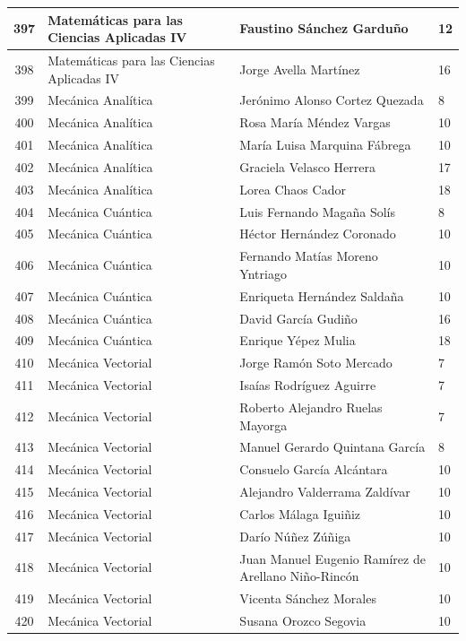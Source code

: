{\begin{longtable}{|c|p{6.5cm}|p{5cm}|p{1.5cm}|}
397 & Matemáticas para las Ciencias Aplicadas IV & Faustino Sánchez Garduño & 12 \\ \hline
398 & Matemáticas para las Ciencias Aplicadas IV & Jorge Avella Martínez & 16 \\ \hline
399 & Mecánica Analítica & Jerónimo Alonso Cortez Quezada & 8 \\ \hline
400 & Mecánica Analítica & Rosa María Méndez Vargas & 10 \\ \hline
401 & Mecánica Analítica & María Luisa Marquina Fábrega & 10 \\ \hline
402 & Mecánica Analítica & Graciela Velasco Herrera & 17 \\ \hline
403 & Mecánica Analítica & Lorea Chaos Cador & 18 \\ \hline
404 & Mecánica Cuántica & Luis Fernando Magaña Solís & 8 \\ \hline
405 & Mecánica Cuántica & Héctor Hernández Coronado & 10 \\ \hline
406 & Mecánica Cuántica & Fernando Matías Moreno Yntriago & 10 \\ \hline
407 & Mecánica Cuántica & Enriqueta Hernández Saldaña & 10 \\ \hline
408 & Mecánica Cuántica & David García Gudiño & 16 \\ \hline
409 & Mecánica Cuántica & Enrique Yépez Mulia & 18 \\ \hline
410 & Mecánica Vectorial & Jorge Ramón Soto Mercado & 7 \\ \hline
411 & Mecánica Vectorial & Isaías Rodríguez Aguirre & 7 \\ \hline
412 & Mecánica Vectorial & Roberto Alejandro Ruelas Mayorga & 7 \\ \hline
413 & Mecánica Vectorial & Manuel Gerardo Quintana García & 8 \\ \hline
414 & Mecánica Vectorial & Consuelo García Alcántara & 10 \\ \hline
415 & Mecánica Vectorial & Alejandro Valderrama Zaldívar & 10 \\ \hline
416 & Mecánica Vectorial & Carlos Málaga Iguiñiz & 10 \\ \hline
417 & Mecánica Vectorial & Darío Núñez Zúñiga & 10 \\ \hline
418 & Mecánica Vectorial & Juan Manuel Eugenio Ramírez de Arellano Niño-Rincón & 10 \\ \hline
419 & Mecánica Vectorial & Vicenta Sánchez Morales & 10 \\ \hline
420 & Mecánica Vectorial & Susana Orozco Segovia & 10 \\ \hline

\end{longtable}}
